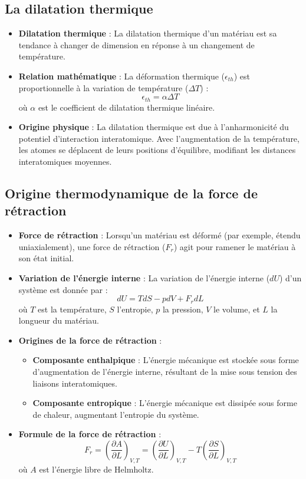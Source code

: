 \documentclass{article}
\begin{document}
    \subsection{La dilatation thermique}
    
    \begin{itemize}
        \item \textbf{Dilatation thermique} : La dilatation thermique d'un matériau est sa tendance à changer de dimension en réponse à un changement de température.
        \item \textbf{Relation mathématique} : La déformation thermique ($\epsilon_{th}$) est proportionnelle à la variation de température ($\Delta T$) :
        \[
        \epsilon_{th} = \alpha \Delta T
        \]
        où $\alpha$ est le coefficient de dilatation thermique linéaire.
        \item \textbf{Origine physique} : La dilatation thermique est due à l'anharmonicité du potentiel d'interaction interatomique. Avec l'augmentation de la température, les atomes se déplacent de leurs positions d'équilibre, modifiant les distances interatomiques moyennes.
    \end{itemize}
    
    \subsection{Origine thermodynamique de la force de rétraction}
    
    \begin{itemize}
        \item \textbf{Force de rétraction} : Lorsqu'un matériau est déformé (par exemple, étendu uniaxialement), une force de rétraction ($F_r$) agit pour ramener le matériau à son état initial.
        \item \textbf{Variation de l'énergie interne} : La variation de l'énergie interne ($dU$) d'un système est donnée par :
        \[
        dU = T dS - p dV + F_r dL
        \]
        où $T$ est la température, $S$ l'entropie, $p$ la pression, $V$ le volume, et $L$ la longueur du matériau.
        \item \textbf{Origines de la force de rétraction} :
        \begin{itemize}
            \item \textbf{Composante enthalpique} : L'énergie mécanique est stockée sous forme d'augmentation de l'énergie interne, résultant de la mise sous tension des liaisons interatomiques.
            \item \textbf{Composante entropique} : L'énergie mécanique est dissipée sous forme de chaleur, augmentant l'entropie du système.
        \end{itemize}
        \item \textbf{Formule de la force de rétraction} :
        \[
        F_r = \left( \frac{\partial A}{\partial L} \right)_{V,T} = \left( \frac{\partial U}{\partial L} \right)_{V,T} - T \left( \frac{\partial S}{\partial L} \right)_{V,T}
        \]
        où $A$ est l'énergie libre de Helmholtz.
    \end{itemize}
    
\end{document}
